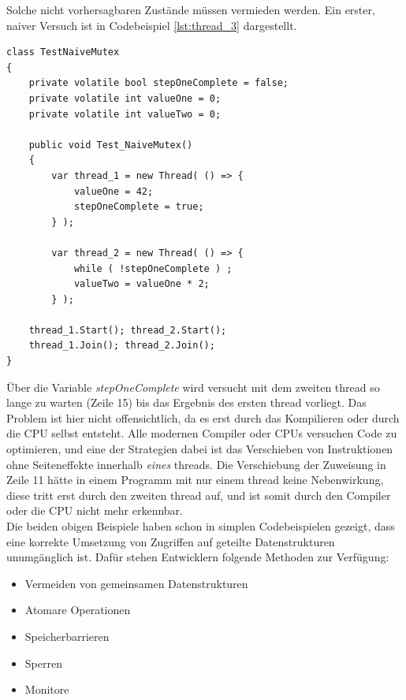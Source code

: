 Solche nicht vorhersagbaren Zustände müssen vermieden werden. Ein erster, naiver Versuch ist in Codebeispiel \ref{lst:thread_3} dargestellt.\cite[S. 180]{Dahlin2012}
\begin{lstlisting}[caption={Thread naiver Mutex},label={lst:thread_3},captionpos=b]
class TestNaiveMutex
{
    private volatile bool stepOneComplete = false;
	private volatile int valueOne = 0;
	private volatile int valueTwo = 0;

	public void Test_NaiveMutex()
	{
		var thread_1 = new Thread( () => {
			valueOne = 42;
			stepOneComplete = true;
		} );

		var thread_2 = new Thread( () => {
			while ( !stepOneComplete ) ;
			valueTwo = valueOne * 2;
		} );

	thread_1.Start(); thread_2.Start();
	thread_1.Join(); thread_2.Join();
}
\end{lstlisting}
Über die Variable \textit{stepOneComplete} wird versucht mit dem zweiten thread so lange zu warten (Zeile 15) bis das Ergebnis des ersten thread vorliegt. Das Problem ist hier nicht offensichtlich, da es erst durch das Kompilieren oder durch die CPU selbst entsteht. Alle modernen Compiler oder CPUs versuchen Code zu optimieren, und eine der Strategien dabei ist das Verschieben von Instruktionen ohne Seiteneffekte innerhalb \textit{eines} threads\cite[S. 100]{ecma335}. Die Verschiebung der Zuweisung in Zeile 11 hätte in einem Programm mit nur einem thread keine Nebenwirkung, diese tritt erst durch den zweiten thread auf, und ist somit durch den Compiler oder die CPU nicht mehr erkennbar.
\\Die beiden obigen Beispiele haben schon in simplen Codebeispielen gezeigt, dass eine korrekte Umsetzung von Zugriffen auf geteilte Datenstrukturen unumgänglich ist. Dafür stehen Entwicklern folgende Methoden zur Verfügung\cite[S. 170ff]{tanenbaum2016}:
\begin{itemize}
	\item Vermeiden von gemeinsamen Datenstrukturen
	\item Atomare Operationen
	\item Speicherbarrieren
	\item Sperren
	\item Monitore
\end{itemize}
